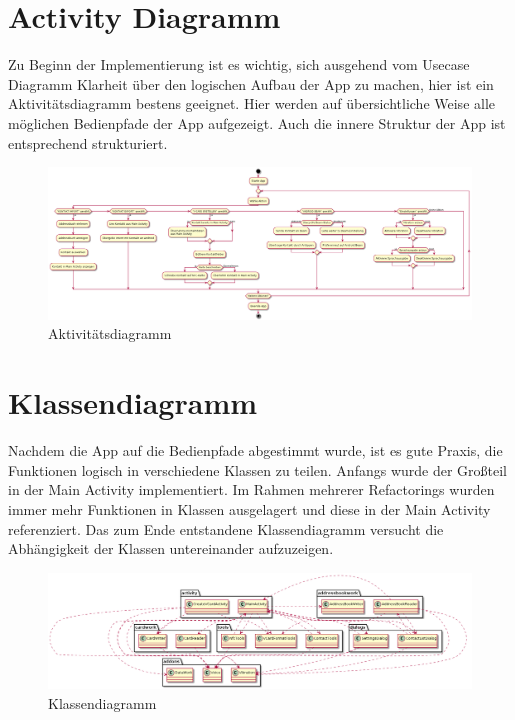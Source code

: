 \documentclass[a4paper,ngerman,12pt]{scrreprt}
\newcommand{\+}{\discretionary{\mbox{\scriptsize$\hookleftarrow$}}{}{}}
\begin{document}
\section{Activity Diagramm}

Zu Beginn der Implementierung ist es wichtig, sich ausgehend vom Usecase Diagramm Klarheit über den logischen Aufbau der App zu machen, hier ist ein Aktivitätsdiagramm bestens geeignet. Hier werden auf übersichtliche Weise alle möglichen Bedienpfade der App aufgezeigt. Auch die innere Struktur der App ist entsprechend strukturiert.

 
\begin{figure}
\includegraphics[width=\textwidth]{general_activity.png}
\caption{Aktivitätsdiagramm}
\end{figure}


\section{Klassendiagramm}

Nachdem die App auf die Bedienpfade abgestimmt wurde, ist es gute Praxis, die Funktionen logisch in verschiedene Klassen zu teilen. Anfangs wurde der Großteil in der Main Activity implementiert. Im Rahmen mehrerer Refactorings wurden immer mehr Funktionen in Klassen ausgelagert und diese in der Main Activity referenziert. Das zum Ende entstandene Klassendiagramm versucht die Abhängigkeit der Klassen untereinander aufzuzeigen.

 
\begin{figure}
\includegraphics[width=\textwidth]{general_class.png}
\caption{Klassendiagramm}
\end{figure}
\end{document}
